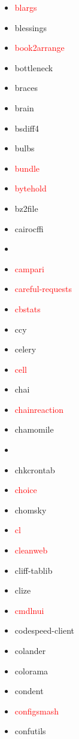 \documentclass{l4proj}
\begin{document}
\begin{appendices}
{\begin{itemize}
\item\textcolor{red}{blargs}
\item blessings
\end{itemize}
}%
\noindent\parbox[t]{0.32\textwidth}{\raggedright%
\begin{itemize}
\item\textcolor{red}{book2arrange}
\item bottleneck
\item braces
\item brain
\item bsdiff4
\item bulbs
\item\textcolor{red}{bundle}
\item\textcolor{red}{bytehold}
\item bz2file
\item cairocffi
\item\textcolor{red}{}
\item\textcolor{red}{campari}
\item\textcolor{red}{careful-requests}
\item\textcolor{red}{cbstats}
\item ccy
\item celery
\item\textcolor{red}{cell}
\end{itemize}
}%
\clearpage
\noindent\parbox[t]{0.32\textwidth}{\raggedright%
\begin{itemize}
\item chai
\item\textcolor{red}{chainreaction}
\item chamomile
\item {}
\item chkcrontab
\item\textcolor{red}{choice}
\item chomsky
\item\textcolor{red}{cl}
\item\textcolor{red}{cleanweb}
\item cliff-tablib
\item clize
\item\textcolor{red}{cmdlnui}
\item codespeed-client
\item colander
\item colorama
\item condent
\item\textcolor{red}{configsmash}
\item confutils

\end{itemize}}
\end{appendices}
\end{document}
